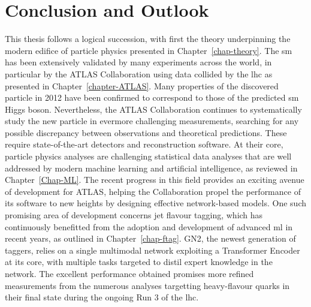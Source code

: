 \chapter{\color{oxfordblue} Conclusion and Outlook}\label{chap-Conclusion}
\ChapFrame
\vspace{-1cm}
This thesis follows a logical succession, with first the theory underpinning the modern edifice of particle physics presented in Chapter~\ref{chap-theory}. The \gls{sm} has been extensively validated by many experiments across the world, in particular by the ATLAS Collaboration using data collided by the \gls{lhc} as presented in Chapter~\ref{chapter-ATLAS}. Many properties of the discovered particle in 2012 have been confirmed to correspond to those of the predicted \gls{sm} Higgs boson. Nevertheless, the ATLAS Collaboration continues to systematically study the new particle in evermore challenging measurements, searching for any possible discrepancy between observations and theoretical predictions. These require state-of-the-art detectors and reconstruction software. At their core, particle physics analyses are challenging statistical data analyses that are well addressed by modern machine learning and artificial intelligence, as reviewed in Chapter~\ref{Chap-ML}. The recent progress in this field provides an exciting avenue of development for ATLAS, helping the Collaboration propel the performance of its software to new heights by designing effective network-based models. One such promising area of development concerns jet flavour tagging, which has continuously benefitted from the adoption and development of advanced \gls{ml} in recent years, as outlined in Chapter~\ref{chap-ftag}. GN2, the newest generation of taggers, relies on a single multimodal network exploiting a Transformer Encoder at its core, with multiple tasks targeted to distil expert knowledge in the network. The excellent performance obtained promises more refined measurements from the numerous analyses targetting heavy-flavour quarks in their final state during the ongoing Run 3 of the \gls{lhc}. \\


